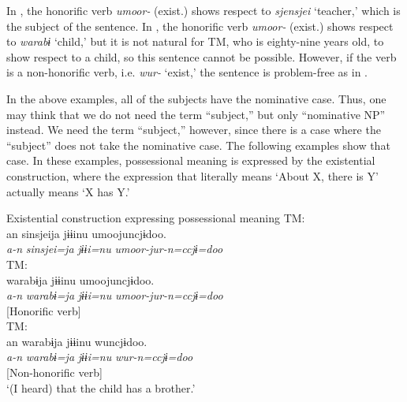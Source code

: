 In , the honorific verb \textit{umoor-} (exist.\HON) shows respect to \textit{sjensjei} ‘teacher,’ which is the subject of the sentence. In , the honorific verb \textit{umoor-} (exist.\HON) shows respect to \textit{warabɨ} ‘child,’ but it is not natural for TM, who is eighty-nine years old, to show respect to a child, so this sentence cannot be possible. However, if the verb is a non-honorific verb, i.e. \textit{wur-} ‘exist,’ the sentence is problem-free as in .

In the above examples, all of the subjects have the nominative case. Thus, one may think that we do not need the term “subject,” but only “nominative NP” instead. We need the term “subject,” however, since there is a case where the “subject” does not take the nominative case. The following examples show that case. In these examples, possessional meaning is expressed by the existential construction, where the expression that literally means ‘About X, there is Y’ actually means ‘X has Y.’

{\smallex
\ea Existential construction expressing possessional meaning
\ea\label{ex:3.2a} {TM:} \hfill\relax[El: 120924] \\
        \gllll   an  {sinsjeija}  {jɨɨinu}  {umoojuncjɨdoo.}\\
                 {\itshape a-n}  {\itshape sinsjei=ja}  {\itshape jɨɨi=nu}  {\itshape umoor-jur-n=ccjɨ=doo}\\
                 [{\DIST-\ADNZ}  {teacher]=\TOP}  {brother=\NOM}  {[exist.\HON-\UMRK-\PTCP]=\QT=\ASS}\\
                 {[Subject]} {} {}   {[Honorific verb]}\\
    \glt ‘(I heard) that the teacher has a brother.’\\\relax
         [lit. ‘(I heard) that about the teacher, there is a brother.’]
\ex\label{ex:3.2b} {TM:} \hfill\relax [El: 120924] \\
        {warabɨja}  {jɨɨinu}  {umoojuncjɨdoo.}\\
                   {\itshape a-n}  {\itshape warabɨ=ja}  {\itshape jɨɨi=nu}  {\itshape umoor-jur-n=ccjɨ=doo}\\
                   [{\DIST-\ADNZ}  {child]=\TOP}  {brother=\NOM}  {[exist.\HON-\UMRK-\PTCP]=\QT=\ASS}\\
                   [Subject]   {}   {}   {[Honorific verb]}\\
\ex \label{ex:3.2c} {TM:}\hfill\relax[El: 120924] \\
\gllll an  {warabɨja}  {jɨɨinu}  {wuncjɨdoo.}\\
   {\itshape a-n}  {\itshape warabɨ=ja}  {\itshape jɨɨi=nu}  {\itshape wur-n=ccjɨ=doo}\\
   [{\DIST-\ADNZ}  {child]=\TOP}  {brother=\NOM}  {[exist-\PTCP]=\QT=\ASS}\\
   [Subject] {} {}     {[Non-honorific verb]}\\
   \glt ‘(I heard) that the child has a brother.’ \\\\
\z
\z} 

